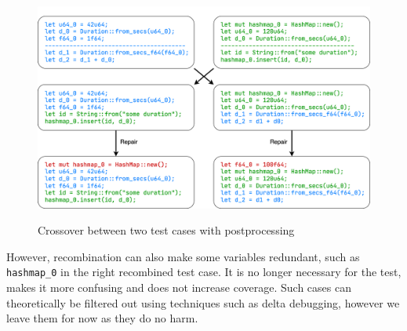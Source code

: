 \documentclass[paper=a4,%
  twoside,%
  BCOR4mm,%
  abstract=true,%
  toc=bibliography,%
  chapterprefix=true,%
  toc=bibliographynumbered,%
  open=right,%
  english,%
  pagesize=pdftex]{scrreprt}
\begin{document}
\begin{figure}[h]
\caption{Crossover between two test cases with postprocessing}
\centering
\includegraphics[width=\textwidth]{crossover}
\label{fig:crossover-example}
\end{figure}

However, recombination can also make some variables redundant, such as \texttt{hashmap\string_0} in the right recombined test case. It is no longer necessary for the test, makes it more confusing and does not increase coverage. Such cases can theoretically be filtered out using techniques such as delta debugging, however we leave them for now as they do no harm.
\end{document}
